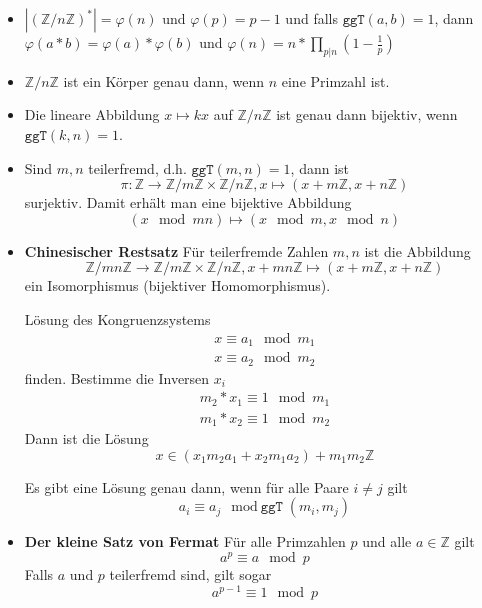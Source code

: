 \documentclass[landscape, 8pt, a4paper]{extarticle}
\newcommand{\ggT}{\texttt{ggT}}
\newcommand{\Z}{\mathbb{Z}}
\begin{document}
\begin{multicols}{3}
\begin{itemize}
		\item $|(\Z/n\Z)^\ast|=\varphi(n)$ und $\varphi(p)=p-1$ und falls $\ggT(a,b)=1$, dann $ \varphi(a*b)=\varphi(a)*\varphi(b)$ und $\varphi(n)=n*\prod_{p|n}(1-\frac1p)$

		\item $\Z/n\Z$ ist ein Körper genau dann, wenn $n$ eine Primzahl ist.

		\item Die lineare Abbildung $x\mapsto kx$ auf $\Z/n\Z$ ist genau dann bijektiv, wenn $\ggT(k,n)=1$.
		
		\item Sind $m,n$ teilerfremd, d.h. $\ggT(m,n)=1$, dann ist
		\begin{equation*}
			\pi:\Z\rightarrow\Z/m\Z\times\Z/n\Z, x\mapsto(x+m\Z,x+n\Z)
		\end{equation*}
		surjektiv. Damit erhält man eine bijektive Abbildung
		\begin{equation*}
			(x\mod mn)\mapsto (x\mod m,x\mod n)
		\end{equation*}
		\item \textbf{Chinesischer Restsatz}
		Für teilerfremde Zahlen $m,n$ ist die Abbildung
		\begin{equation*}
			\Z/mn\Z\rightarrow \Z/m\Z\times \Z/n\Z, 
			x+mn\Z\mapsto (x+m\Z,x+n\Z)
		\end{equation*}
		ein Isomorphismus (bijektiver Homomorphismus).

		Lösung des Kongruenzsystems
		\begin{align*}
			x\equiv a_1\mod m_1\\
			x\equiv a_2\mod m_2
		\end{align*}
		finden. Bestimme die Inversen $x_i$
		\begin{align*}
			m_2*x_1\equiv 1 \mod m_1\\
			m_1*x_2\equiv 1 \mod m_2
		\end{align*}
		Dann ist die Lösung
		\begin{equation*}
			x\in (x_1m_2a_1+x_2m_1a_2)+m_1m_2\Z
		\end{equation*}

		Es gibt eine Lösung genau dann, wenn für alle Paare $i\neq j$ gilt
		\begin{equation*}
			a_i\equiv a_j\mod \ggT(m_i,m_j)
		\end{equation*}

		\item \textbf{Der kleine Satz von Fermat} Für alle Primzahlen $p$ und alle $a\in\Z$ gilt
		\begin{equation*}
			a^p\equiv a\mod p
		\end{equation*}
		Falls $a$ und $p$ teilerfremd sind, gilt sogar
		\begin{equation*}
			a^{p-1}\equiv 1\mod p
		\end{equation*}


\end{itemize}
\end{multicols}
\end{document}
